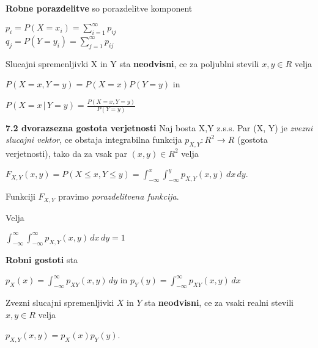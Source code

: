 \documentclass{article}
\begin{document}
\begin{multicols}{3}
\textbf{Robne porazdelitve} so porazdelitve komponent\\
\begin{center}
    \begin{math}
        p_i = P(X = x_i) = \sum_{i = 1}^{\infty} p_{ij}
    \end{math}\\
    \begin{math}
        q_j = P(Y = y_i) = \sum_{j = 1}^{\infty} p_{ij}
    \end{math}
\end{center}
Slucajni spremenljivki X in Y sta \textbf{neodvisni},
ce za poljublni stevili $x,y \in R$ velja
\begin{center}
    \begin{math}
        P(X = x, Y = y) = P(X = x)P(Y = y)
    \end{math} in
\end{center}
\begin{center}
    \begin{math}
        P(X = x\, |\, Y = y) = \frac{P(X = x, Y = y)}{P(Y = y)}
    \end{math}
\end{center}

\textbf{7.2 dvorazsezna gostota verjetnosti}
Naj bosta X,Y z.s.s. Par (X, Y) je \textit{zvezni slucajni vektor},
ce obstaja integrabilna funkcija $p_{X,Y}: R^2 \rightarrow R$ (gostota verjetnosti), tako da za
vsak par $(x,y) \in R^2$ velja
\begin{center}
    \begin{math}
        F_{X,Y}(x, y) = P(X \leq x, Y \leq y) = \int_{-\infty}^{x}\int_{-\infty}^{y} p_{X,Y}(x,y)\,dx\,dy
    \end{math}.
\end{center}
\begin{small}
Funkciji $F_{X,Y}$ pravimo \textit{porazdelitvena funkcija}.    
\end{small}
Velja
\begin{center}
    \begin{math}
        \int_{-\infty}^{\infty}\int_{-\infty}^{\infty} p_{X,Y}(x,y)\,dx\,dy = 1
    \end{math}
\end{center}
\textbf{Robni gostoti} sta
\begin{center}
    \begin{math}
        p_X(x) = \int_{-\infty}^{\infty} p_{XY}(x,y)\, dy
    \end{math} in
    \begin{math}
        p_Y(y) = \int_{-\infty}^{\infty} p_{XY}(x,y)\, dx
    \end{math}
\end{center}
Zvezni slucajni spremenljivki $X$ in $Y$ sta \textbf{neodvisni}, ce
za vsaki realni stevili $x, y \in R$ velja
\begin{center}
    \begin{math}
        p_{X,Y}(x,y) = p_X(x)p_Y(y)
    \end{math}.
\end{center}


\end{multicols}
\end{document}

